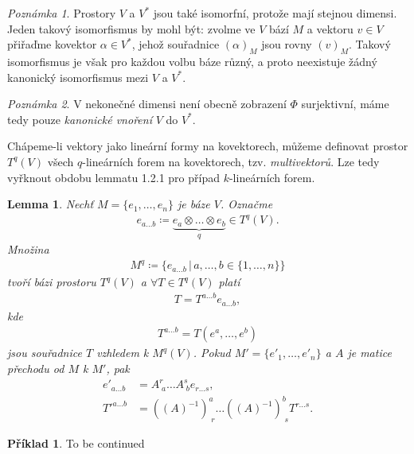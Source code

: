 \documentclass[a4paper,11pt]{report}
\theoremstyle{theorem}
\newtheorem{lemma}[theorem]{Lemma}
\theoremstyle{remark}
\newtheorem*{remark}{Poznámka}
\theoremstyle{definition}
\newtheorem*{example}{Příklad}
\begin{document}
			\begin{remark}
				Prostory $V$ a $V^*$ jsou také isomorfní, protože mají stejnou dimensi. Jeden takový isomorfismus by mohl být: zvolme ve $V$ bází $M$ a vektoru $v \in V$ přiřaďme kovektor $\alpha \in V^*$, jehož souřadnice $(\alpha)_M$ jsou rovny $(v)_M$. Takový isomorfismus je však pro každou volbu báze různý, a proto neexistuje žádný kanonický isomorfismus mezi $V$ a $V^*$.
			\end{remark}
			
			\begin{remark}
				V nekonečné dimensi není obecně zobrazení $\Phi$ surjektivní, máme tedy pouze \textit{kanonické vnoření} $V$ do $V^*$.
			\end{remark}
			
			Chápeme-li vektory jako lineární formy na kovektorech, můžeme definovat prostor $T^q(V)$ všech $q$-lineárních forem na kovektorech, tzv. \textit{multivektorů}. Lze tedy vyřknout obdobu lemmatu 1.2.1 pro případ $k$-lineárních forem.
			\begin{lemma}
				Nechť $M=\{e_1, \dots, e_n\}$ je báze $V$. Označme
				\begin{align*}
					e_{a \dots b} \coloneqq \underbrace{e_a \otimes \dots \otimes e_b}_q \in T^q(V).
				\end{align*}
				Množina
				\begin{align*}
					M^q \coloneqq \{ e_{a \dots b} \, | \, a, \dots, b \in \{1,\dots,n\} \}
				\end{align*}
				tvoří bázi prostoru $T^q(V)$ a $\forall T \in T^q(V)$ platí
				\begin{align*}
					T = T^{a \dots b} e_{a \dots b},
				\end{align*}
				kde
				\begin{align*}
					T^{a \dots b} = T(e^a, \dots, e^b)
				\end{align*}
				jsou souřadnice $T$ vzhledem k $M^q(V)$. Pokud $M' = \{e'_1, \dots, e'_n\}$ a $A$ je matice přechodu od $M$ k $M'$, pak
				\begin{align*}
					e'_{a \dots b} &= A^r_{\; a} \dots A^s_{\; b} e_{r \dots s},
				\\
					T'^{a \dots b} &= ((A)^{-1})^a_{\; r} \dots ((A)^{-1})^b_{\; s} T^{r \dots s}.
				\end{align*}
			\end{lemma}
			
			\begin{example}
				To be continued
			\end{example}
			
			
	
\end{document}

